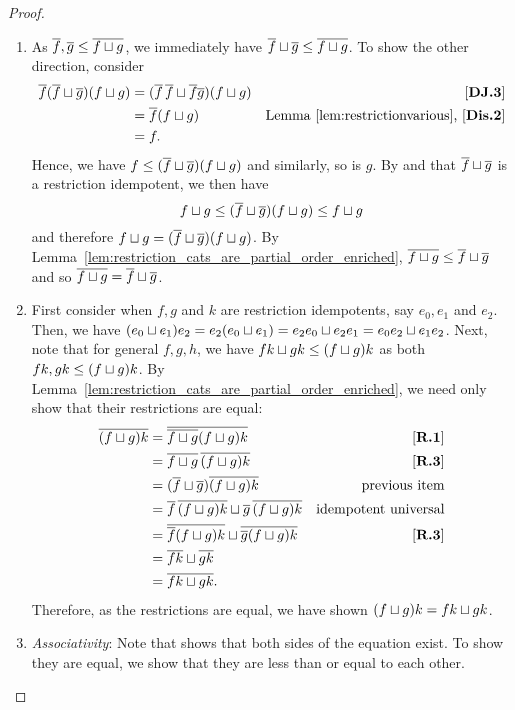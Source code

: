 \begin{proof}
  \prepprooflist
  \begin{enumerate}[{(}i{)}]
    \item As $\overline{f}, \overline{g} \le \overline{f\sqcup g}$, we immediately have
      $\overline{f} \sqcup \overline{g} \le \overline{f \sqcup g}$. To show the other direction, consider
      \begin{align*}
        \overline{f}(\overline{f} \sqcup \overline{g}) (f \sqcup g)
        &= (\overline{f}\,\overline{f} \sqcup \overline{f}\overline{g})(f \sqcup g) &\text{\ensuremath{[\text{\bfseries {DJ}.{3}}]}}\\
        &= \overline{f} (f\sqcup g) &\text{Lemma~\ref{lem:restrictionvarious}, \ensuremath{[\text{\bfseries {Dis}.{2}}]}}\\
        &= f.
      \end{align*}
      Hence, we have $f \le (\overline{f} \sqcup \overline{g}) (f \sqcup g)$ and similarly, so is $g$. By
       and that $\overline{f} \sqcup \overline{g}$ is a restriction idempotent, we then have
      \[
        f \sqcup g \le (\overline{f} \sqcup \overline{g}) (f \sqcup g) \le f \sqcup g
      \]
      and therefore $f \sqcup g = (\overline{f} \sqcup \overline{g}) (f \sqcup g)$. By
      Lemma~\ref{lem:restriction_cats_are_partial_order_enriched}, $\overline{f\sqcup g} \le \overline{f}
      \sqcup \overline{g}$ and so $\overline{f\sqcup g} = \overline{f}\sqcup \overline{g}$.
    \item First consider when $f, g$ and $k$ are restriction idempotents, say $e_0, e_1 $ and $e_2$.
      Then, we have $(e_0 \sqcup e_1)e_2 = e_2(e_0 \sqcup e_1) = e_2 e_0 \sqcup e_2 e_1 =
      e_0 e_2 \sqcup e_1 e_2$.
      Next, note that for general $f,g,h$, we have $f k \sqcup g k \le (f\sqcup g) k$ as both
      $fk, gk \le (f\sqcup g) k$.
      By Lemma~\ref{lem:restriction_cats_are_partial_order_enriched}, we need only show that their
      restrictions are equal:
      \begin{align*}
        \overline{(f\sqcup g)k} &= \overline{\overline{f\sqcup g}(f\sqcup g) k } & [\text{\bfseries {R}.{1}}] \\
        & = \overline{f\sqcup g}\, \overline{(f\sqcup g)k } & [\text{\bfseries {R}.{3}}]\\
        & = (\overline{f}\sqcup \overline{g}) \overline{(f\sqcup g)k }  & \text{previous item}\\
        & = \overline{f}\,\overline{(f\sqcup g)k } \sqcup \overline{g}\, \overline{(f\sqcup g)k }
          &\text{idempotent universal}\\
        & = \overline{\overline{f} (f\sqcup g)k} \sqcup \overline{\overline{g} (f\sqcup g)k} & [\text{\bfseries {R}.{3}}]\\
        & = \overline{f k} \sqcup \overline{g k}\\
        & = \overline{f k \sqcup g k}.
      \end{align*}
      Therefore, as the restrictions are equal, we have shown $(f\sqcup g)k = f k \sqcup g k$.
    \item \emph{Associativity}: Note that  shows that both sides of the equation
      exist. To show they are equal, we show that they are less than or equal to each other.


\end{enumerate}
\end{proof}
